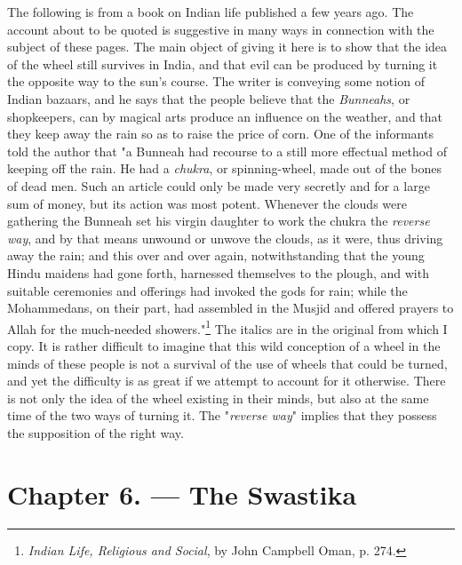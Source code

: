 \documentclass[a4paper, 11pt, oneside, polutonikogreek, english]{article}
\begin{document}
The following is from a book on Indian life published a few years ago. The account about to be quoted is suggestive in many ways in connection with the subject of these pages. The main object of giving it here is to show that the idea of the wheel still survives in India, and that evil can be produced by turning it the opposite way to the sun's course. The writer is conveying some notion of Indian bazaars, and he says that the people believe that the \emph{Bunneahs}, or shopkeepers, can by magical arts produce an influence on the weather, and that they keep away the rain so as to raise the price of corn. One of the informants told the author that "a Bunneah had recourse to a still more effectual method of keeping off the rain. He had a \emph{chukra}, or spinning-wheel, made out of the bones of dead men. Such an article could only be made very secretly and for a large sum of money, but its action was most potent. Whenever the clouds were gathering the Bunneah set his virgin daughter to work the chukra the \emph{reverse way}, and by that means unwound or unwove the clouds, as it were, thus driving away the rain; and this over and over again, notwithstanding that the young Hindu maidens had gone forth, harnessed themselves to the plough, and with suitable ceremonies and offerings had invoked the gods for rain; while the Mohammedans, on their part, had assembled in the Musjid and offered prayers to Allah for the much-needed showers."\footnote{\emph{Indian Life, Religious and Social}, by John Campbell Oman, p. 274.} The italics are in the original from which I copy. It is rather difficult to imagine that this wild conception of a wheel in the minds of these people is not a survival of the use of wheels that could be turned, and yet the difficulty is as great if we attempt to account for it otherwise. There is not only the idea of the wheel existing in their minds, but also at the same time of the two ways of turning it. The "\emph{reverse way}" implies that they possess the supposition of the right way.
\clearpage
\section{Chapter 6. --- The Swastika}
\end{document}

